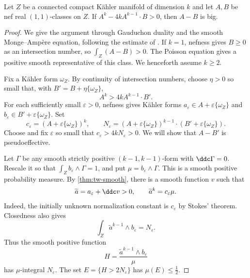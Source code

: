 \begin{theorem}\label{nk:thm:nef-difference}
Let $Z$ be a connected compact K\"ahler manifold of dimension $k$ and let
$A,B$ be nef real $(1,1)$-classes on $Z$. If
$A^k-4kA^{k-1}\cdot B>0$, then $A-B$ is big.
\end{theorem}
\begin{proof}
We give the argument through Gauduchon duality and the smooth
Monge--Amp\`ere equation, following the estimate of \cite{Xiao15}.
If $k=1$, nefness gives $B\geq0$ as an intersection number, so
$\int_Z(A-B)>0$. The Poisson equation gives a positive smooth
representative of this class. We henceforth assume $k\geq2$.

Fix a K\"ahler form $\omega_Z$. By continuity of intersection numbers,
choose $\eta>0$ so small that, with $B'=B+\eta\{\omega_Z\}$,
\[
 A^k>4kA^{k-1}\cdot B'.
\]
For each sufficiently small $\varepsilon>0$, nefness gives K\"ahler
forms $a_\varepsilon\in A+\varepsilon\{\omega_Z\}$ and
$b_\varepsilon\in B'+\varepsilon\{\omega_Z\}$. Set
\[
 c_\varepsilon=(A+\varepsilon\{\omega_Z\})^k,
 \qquad
 N_\varepsilon=(A+\varepsilon\{\omega_Z\})^{k-1}
                    \cdot(B'+\varepsilon\{\omega_Z\}).
\]
Choose and fix $\varepsilon$ so small that
$c_\varepsilon>4kN_\varepsilon>0$.
We will show that $A-B'$ is pseudoeffective.

Let $\Gamma$ be any smooth strictly positive $(k-1,k-1)$-form with
$\ddc\Gamma=0$. Rescale it so that
$\int_Z b_\varepsilon\wedge\Gamma=1$, and put
$\mu=b_\varepsilon\wedge\Gamma$. This is a smooth positive probability
measure. By \cref{thm:tw-smooth}, there is a smooth function $v$ such that
\[
 \widetilde a=a_\varepsilon+\ddc v>0,
 \qquad \widetilde a^k=c_\varepsilon\mu.
\]
Indeed, the initially unknown normalization constant is
$c_\varepsilon$ by Stokes' theorem. Closedness also gives
\[
 \int_Z\widetilde a^{k-1}\wedge b_\varepsilon=N_\varepsilon.
\]
Thus the smooth positive function
\[
 H=\frac{\widetilde a^{k-1}\wedge b_\varepsilon}{\mu}
\]
has $\mu$-integral $N_\varepsilon$. The set
$E=\{H>2N_\varepsilon\}$ has $\mu(E)\leq\tfrac12$.


\end{proof}
